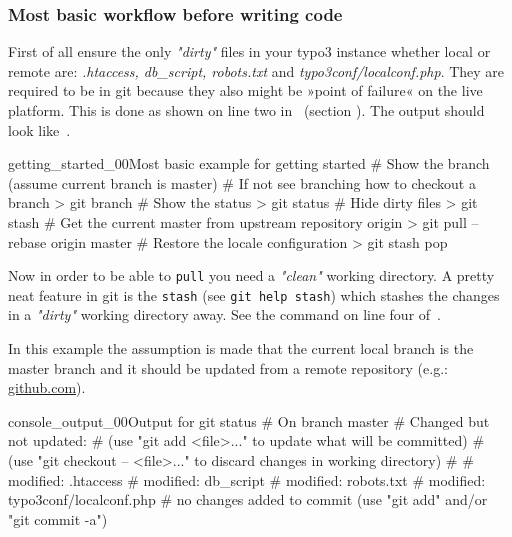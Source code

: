 \subsubsection{Most basic workflow before writing code}
First of all ensure the only \textit{"dirty"} files in your typo3 instance whether local or remote are: \textit{.htaccess, db\_script, robots.txt} and \textit{typo3conf/localconf.php}. They are required to be in git because they also might be »point of failure« on the live platform. This is done as shown on line two in~ (section ). The output should look like~. 
\begin{codelisting}{getting_started_00}{Most basic example for getting started}
# Show the branch (assume current branch is master)
# If not see branching how to checkout a branch 
> git branch
# Show the status
> git status
# Hide dirty files
> git stash
# Get the current master from upstream repository origin
> git pull --rebase origin master 
# Restore the locale configuration
> git stash pop 
\end{codelisting}
Now in order to be able to \texttt{pull} you need a \textit{"clean"} working directory. A pretty neat feature in git is the \texttt{stash} (see \texttt{git help stash}) which stashes the changes in a \textit{"dirty"} working directory away. See the command on line four of~.

In this example the assumption is made that the current local branch is the master branch and it should be updated from a remote repository (e.g.: \href{https://github.com/}{github.com}).
\begin{codelisting}{console_output_00}{Output for git status}
# On branch master
# Changed but not updated:
#   (use "git add <file>..." to update what will be committed)
#   (use "git checkout -- <file>..." to discard changes in working directory)
#
#       modified:   .htaccess
#       modified:   db_script
#       modified:   robots.txt
#       modified:   typo3conf/localconf.php
#
no changes added to commit (use "git add" and/or "git commit -a")
\end{codelisting}
